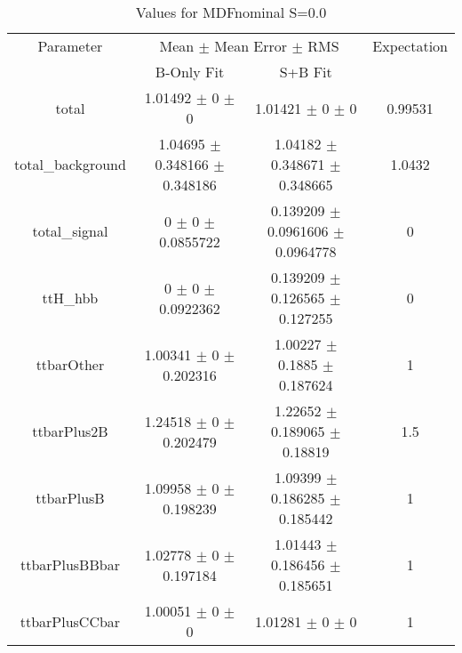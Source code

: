 \begin{table}
\centering
\caption{Values for MDFnominal S=0.0}
\begin{tabular}{cccc}
\toprule
Parameter & \multicolumn{2}{c}{Mean $\pm$ Mean Error $\pm$ RMS} & Expectation\\
 & B-Only Fit & S+B Fit & \\
\midrule
total & \num{1.01492} $\pm$ \num{0} $\pm$ \num{0} & \num{1.01421} $\pm$ \num{0} $\pm$ \num{0} & \num{0.99531}\\
total\_background & \num{1.04695} $\pm$ \num{0.348166} $\pm$ \num{0.348186} & \num{1.04182} $\pm$ \num{0.348671} $\pm$ \num{0.348665} & \num{1.0432}\\
total\_signal & \num{0} $\pm$ \num{0} $\pm$ \num{0.0855722} & \num{0.139209} $\pm$ \num{0.0961606} $\pm$ \num{0.0964778} & \num{0}\\
ttH\_hbb & \num{0} $\pm$ \num{0} $\pm$ \num{0.0922362} & \num{0.139209} $\pm$ \num{0.126565} $\pm$ \num{0.127255} & \num{0}\\
ttbarOther & \num{1.00341} $\pm$ \num{0} $\pm$ \num{0.202316} & \num{1.00227} $\pm$ \num{0.1885} $\pm$ \num{0.187624} & \num{1}\\
ttbarPlus2B & \num{1.24518} $\pm$ \num{0} $\pm$ \num{0.202479} & \num{1.22652} $\pm$ \num{0.189065} $\pm$ \num{0.18819} & \num{1.5}\\
ttbarPlusB & \num{1.09958} $\pm$ \num{0} $\pm$ \num{0.198239} & \num{1.09399} $\pm$ \num{0.186285} $\pm$ \num{0.185442} & \num{1}\\
ttbarPlusBBbar & \num{1.02778} $\pm$ \num{0} $\pm$ \num{0.197184} & \num{1.01443} $\pm$ \num{0.186456} $\pm$ \num{0.185651} & \num{1}\\
ttbarPlusCCbar & \num{1.00051} $\pm$ \num{0} $\pm$ \num{0} & \num{1.01281} $\pm$ \num{0} $\pm$ \num{0} & \num{1}\\
\bottomrule
\end{tabular}
\end{table}